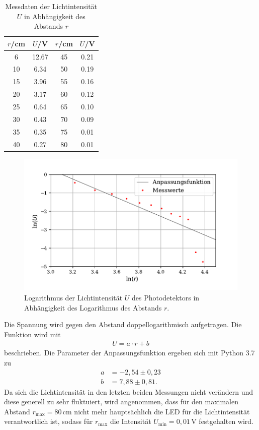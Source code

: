 \begin{table}[H]
\centering
\caption{Messdaten der Lichtintensität $U$ in Abhängigkeit des Abstands $r$}
\label{tab:data4}
\begin{tabular}{c c c c}
\toprule
$r$\:/\:\si{\centi\meter}& $U$\:/\:\si{\volt} & $r$\:/\:\si{\centi\meter}& $U$\:/\:\si{\volt} \\
\midrule
6  & 12.67 & 45 & 0.21 \\
10 &  6.34 & 50 & 0.19 \\
15 &  3.96 & 55 & 0.16 \\
20 &  3.17 & 60 & 0.12 \\
25 &  0.64 & 65 & 0.10 \\
30 &  0.43 & 70 & 0.09 \\
35 &  0.35 & 75 & 0.01 \\
40 &  0.27 & 80 & 0.01 \\
\bottomrule
\end{tabular}
\end{table}

\begin{figure}[H]
  \centering
  \includegraphics{plot3.pdf}
  \caption{Logarithmus der Lichtintensität $U$ des Photodetektors in Abhängigkeit des Logarithmus des Abstands $r$.}
\end{figure}

\noindent Die Spannung wird gegen den Abstand doppellogarithmisch aufgetragen. Die Funktion wird mit 
\begin{align*}
U = a \cdot r + b
\end{align*}
beschrieben. 
Die Parameter der Anpassungsfunktion ergeben sich mit Python 3.7 zu 
\begin{align*}
a &= -2,54 \pm 0,23 \\
b &= 7,88 \pm 0,81 .
\end{align*}
\noindent Da sich die Lichtintensität in den letzten beiden Messungen nicht verändern und
diese generell zu sehr fluktuiert, wird
angenommen, dass für den maximalen Abstand $r_\text{max} = 80\,\si{\centi\meter}$
nicht mehr hauptsächlich die LED für die Lichtintensität verantwortlich ist, sodass
für $r_\text{max}$ die Intensität $U_\text{min} = 0,01\,\si{\volt}$ festgehalten wird.








